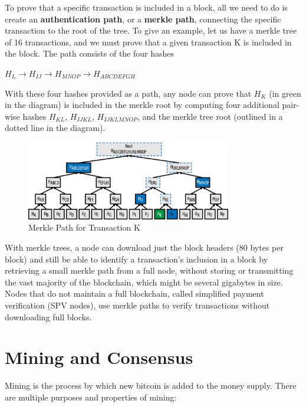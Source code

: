 \documentclass{article}
\begin{document}
    To prove that a specific transaction is included in a block, all we need to do is create an \textbf{authentication path}, or a \textbf{merkle path}, connecting the specific transaction to the root of the tree. To give an example, let us have a merkle tree of 16 transactions, and we must prove that a given transaction K is included in the block. The path consists of the four hashes

    \begin{center}
    $H_L \rightarrow H_{IJ} \rightarrow H_{MNOP} \rightarrow H_{ABCDEFGH}$
    \end{center}

    With these four hashes provided as a path, any node can prove that $H_K$ (in green in the diagram) is included in the merkle root by computing four additional pair-wise hashes $H_{KL}$, $H_{IJKL}$, $H_{IJKLMNOP}$, and the merkle tree root (outlined in a dotted line in the diagram).

    \begin{figure}[H]
    \centering
    \includegraphics[width=0.8\textwidth]{img/msbt_0705.png}
    \caption{Merkle Path for Transaction K}
    \end{figure}

    With merkle trees, a node can download just the block headers (80 bytes per block) and still be able to identify a transaction's inclusion in a block by retrieving a small merkle path from a full node, without storing or transmitting the vast majority of the blockchain, which might be several gigabytes in size. Nodes that do not maintain a full blockchain, called simplified payment verification (SPV nodes), use merkle paths to verify transactions without downloading full blocks.

\section{Mining and Consensus}

    Mining is the process by which new bitcoin is added to the money supply. There are multiple purposes and properties of mining:
\end{document}
